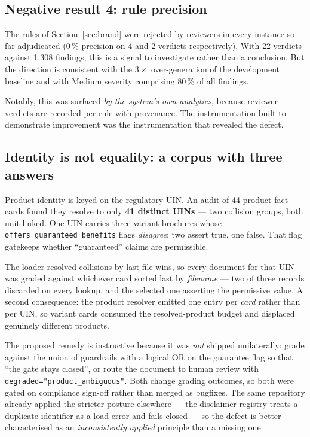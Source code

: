 \documentclass[10pt]{article}
\newcommand{\code}[1]{\texttt{\small #1}}
\begin{document}
\subsection{Negative result 4: rule precision}

The rules of Section~\ref{sec:brand} were rejected by reviewers in every
instance so far adjudicated (0\,\% precision on 4 and 2 verdicts
respectively). With 22 verdicts against 1{,}308 findings, this is a signal to
investigate rather than a conclusion. But the direction is consistent with the
$3\times$ over-generation of the development baseline and with Medium severity
comprising 80\,\% of all findings.

Notably, this was surfaced \emph{by the system's own analytics}, because
reviewer verdicts are recorded per rule with provenance. The instrumentation
built to demonstrate improvement was the instrumentation that revealed the
defect.

\subsection{Identity is not equality: a corpus with three answers}

Product identity is keyed on the regulatory UIN. An audit of 44 product fact
cards found they resolve to only \textbf{41 distinct UINs} --- two collision
groups, both unit-linked. One UIN carries three variant brochures whose
\code{offers\_guaranteed\_benefits} flags \emph{disagree}: two assert true, one
false. That flag gatekeeps whether ``guaranteed'' claims are permissible.

The loader resolved collisions by last-file-wins, so every document for that
UIN was graded against whichever card sorted last by \emph{filename} --- two of
three records discarded on every lookup, and the selected one asserting the
permissive value. A second consequence: the product resolver emitted one entry
per \emph{card} rather than per UIN, so variant cards consumed the
resolved-product budget and displaced genuinely different products.

The proposed remedy is instructive because it was \emph{not} shipped
unilaterally: grade against the union of guardrails with a logical OR on the
guarantee flag so that ``the gate stays closed'', or route the document to
human review with \code{degraded="product\_ambiguous"}. Both change grading
outcomes, so both were gated on compliance sign-off rather than merged as
bugfixes. The same repository already applied the stricter posture elsewhere
--- the disclaimer registry treats a duplicate identifier as a load error and
fails closed --- so the defect is better characterised as an \emph{inconsistently
applied} principle than a missing one.
\end{document}

